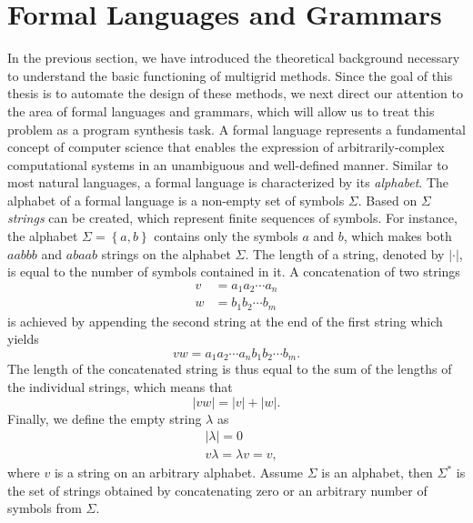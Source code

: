 \section{Formal Languages and Grammars}
\label{sec:formal-languages}
In the previous section, we have introduced the theoretical background necessary to understand the basic functioning of multigrid methods.
Since the goal of this thesis is to automate the design of these methods, we next direct our attention to the area of formal languages and grammars, which will allow us to treat this problem as a program synthesis task.
A formal language represents a fundamental concept of computer science that enables the expression of arbitrarily-complex computational systems in an unambiguous and well-defined manner.
Similar to most natural languages, a formal language is characterized by its \emph{alphabet}. 
The alphabet of a formal language is a non-empty set of symbols $\Sigma$.
Based on $\Sigma$ \emph{strings} can be created, which represent finite sequences of symbols.
For instance, the alphabet $\Sigma = \left\{a, b\right\}$ contains only the symbols $a$ and $b$, which makes both $aabbb$ and $abaab$ strings on the alphabet $\Sigma$.
The length of a string, denoted by $|\cdot|$, is equal to the number of symbols contained in it. 
A concatenation of two strings 
\begin{equation}
	\begin{split}
		v & = a_1 a_2 \cdots a_n \\
		w & = b_1 b_2 \cdots b_m
	\end{split}
\end{equation}
is achieved by appending the second string at the end of the first string which yields
\begin{equation}
	vw = a_1 a_2 \cdots a_n b_1 b_2 \cdots b_m.
\end{equation}
The length of the concatenated string is thus equal to the sum of the lengths of the individual strings, which means that
\begin{equation}
|vw| = |v| + |w|.
\end{equation}
Finally, we define the empty string $\lambda$ as
\begin{equation}
	\begin{split}
		& |\lambda| = 0 \\
		& v \lambda = \lambda v = v,
	\end{split}
\end{equation}
where $v$ is a string on an arbitrary alphabet.
Assume $\Sigma$ is an alphabet, then $\Sigma^*$ is the set of strings obtained by concatenating zero or an arbitrary number of symbols from $\Sigma$.
